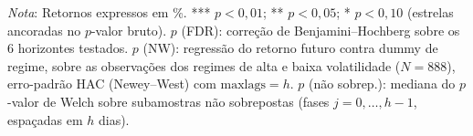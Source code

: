 \begin{table}[H]
\centering
\small
\caption{Diferença de retornos futuros entre regimes de alta e baixa volatilidade, sob quatro critérios de inferência.}
\label{tab:retnl-teste-t}
\par\smallskip
\footnotesize\textit{Nota}: Retornos expressos em \%. *** $p<0{,}01$; ** $p<0{,}05$; * $p<0{,}10$ (estrelas ancoradas no $p$-valor bruto). $p$ (FDR): correção de Benjamini--Hochberg sobre os 6 horizontes testados. $p$ (NW): regressão do retorno futuro contra dummy de regime, sobre as observações dos regimes de alta e baixa volatilidade ($N=888$), erro-padrão HAC (Newey--West) com $\text{maxlags}=h$. $p$ (não sobrep.): mediana do $p$-valor de Welch sobre subamostras não sobrepostas (fases $j=0,\ldots,h-1$, espaçadas em $h$ dias).
\end{table}